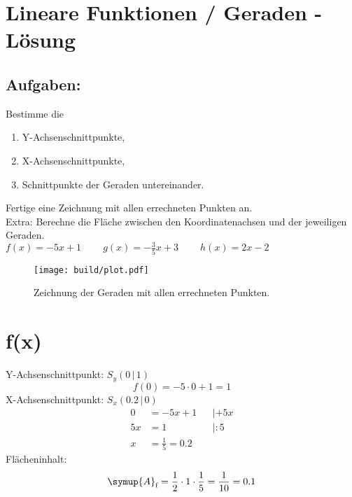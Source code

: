 



\section*{Lineare Funktionen / Geraden - Lösung}
\subsection*{Aufgaben:}
Bestimme die
\begin{enumerate}
      \item Y-Achsenschnittpunkte,
      \item X-Achsenschnittpunkte,
      \item Schnittpunkte der Geraden untereinander.
\end{enumerate}
Fertige eine Zeichnung mit allen errechneten Punkten an.\\
Extra: Berechne die Fläche zwischen den Koordinatenachsen und der jeweiligen Geraden.
\\
$f(x) = -5x + 1 \;\;\;\;\;\;\;\;
g(x) = -\frac{3}{5}x + 3 \;\;\;\;\;\;\;\;
h(x) = 2x - 2$

\begin{figure}
      \centering
      \texttt{[image: build/plot.pdf]}
      \caption{Zeichnung der Geraden mit allen errechneten Punkten.}
\end{figure}

\newpage
\section*{f(x)}
Y-Achsenschnittpunkt: $S_y (0\,|\,1)$
\begin{equation}
      f(0) = -5\cdot0 + 1 = 1
\end{equation}
X-Achsenschnittpunkt: $S_x (0.2\,|\,0)$
\begin{align}
      0 &= -5x + 1 && | + 5x \\
      5x &= 1 && | : 5 \\
      x &= \frac{1}{5} = 0.2
\end{align}
Flächeninhalt:
\begin{equation}
      \symup{A}_\text{f} = \frac{1}{2} \cdot 1 \cdot \frac{1}{5}
            = \frac{1}{10} = 0.1
\end{equation}

